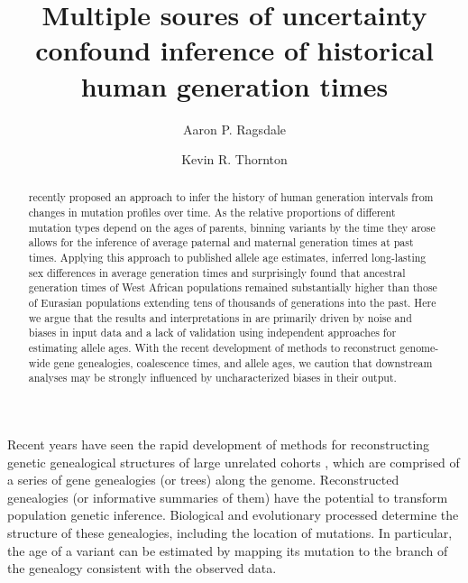 \documentclass[]{article}
\title{Multiple soures of uncertainty confound inference of
historical human generation times}
\author[1,*]{Aaron P. Ragsdale}
\author[2]{Kevin R. Thornton}
\affil[1]{University of Wisconsin--Madison, Wisconsin, USA}
\affil[2]{University of California, Irvine, California, USA}
\affil[*]{apragsdale@wisc.edu}
\begin{document}
\maketitle

\begin{abstract}

    \noindent \citet{wang2023human} recently proposed an approach to infer the
    history of human generation intervals from changes in mutation profiles
    over time. As the relative proportions of different mutation types depend
    on the ages of parents, binning variants by the time they arose allows
    for the inference of average paternal and maternal generation times at past
    times. Applying this approach to published allele age estimates,
    \citet{wang2023human} inferred long-lasting sex differences in average
    generation times and surprisingly found that ancestral generation times of
    West African populations remained substantially higher than those of
    Eurasian populations extending tens of thousands of generations into the
    past. Here we argue that the results and interpretations in
    \citet{wang2023human} are primarily driven by noise and biases in input
    data and a lack of validation using independent approaches for estimating
    allele ages. With the recent development of methods to reconstruct
    genome-wide gene genealogies, coalescence times, and allele ages, we
    caution that downstream analyses may be strongly influenced by
    uncharacterized biases in their output.

\end{abstract}

Recent years have seen the rapid development of methods for reconstructing
genetic genealogical structures of large unrelated cohorts
\citep{speidel2019method,wohns2022unified,hubisz2020mapping}, which are
comprised of a series of gene genealogies (or trees) along the genome.
Reconstructed genealogies (or informative summaries of them) have the potential
to transform population genetic inference. Biological and evolutionary
processed determine the structure of these genealogies, including the
location of mutations. In particular, the age
of a variant can be estimated by mapping its mutation to the branch of the
genealogy consistent with the observed data.
\end{document}
